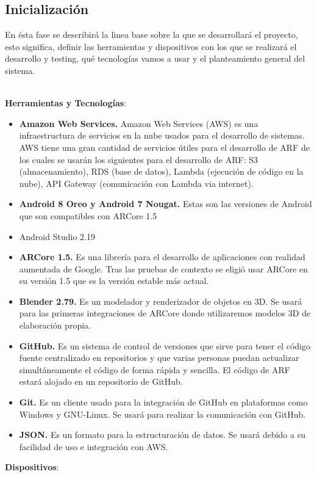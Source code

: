 \subsection{Inicialización}
En ésta fase se describirá la linea base sobre la que se desarrollará el proyecto, esto significa, definir las herramientas y dispositivos con los que se realizará el desarrollo y testing, qué tecnologías vamos a usar y el planteamiento general del sistema.\par
\noindent
\\
\textbf{Herramientas y Tecnologías}:
	\begin{itemize}
			\item \textbf{Amazon Web Services.} Amazon Web Services (AWS) es una infraestructura de servicios en la nube usados para el desarrollo de sistemas. AWS tiene una gran cantidad de servicios útiles para el desarrollo de ARF de los cuales se usarán los siguientes para el desarrollo de ARF: S3 (almacenamiento), RDS (base de datos), Lambda (ejecución de código en la nube), API Gateway (comunicación con Lambda via internet).
			\item \textbf{Android 8 Oreo y Android 7 Nougat.} Estas son las versiones de Android que son compatibles con ARCore 1.5
			\item Android Studio 2.19
			\item \textbf{ARCore 1.5.} Es una librería para el desarrollo de aplicaciones con realidad aumentada de Google. Tras las pruebas de contexto se eligió usar ARCore en su versión 1.5 que es la versión estable más actual.
			\item \textbf{Blender 2.79.} Es un modelador y renderizador de objetos en 3D. Se usará para las primeras integraciones de ARCore donde utilizaremos modelos 3D de elaboración propia.
			\item \textbf{GitHub.} Es un sistema de control de versiones que sirve para tener el código fuente centralizado en repositorios y que varias personas puedan actualizar simultáneamente el código de forma rápida y sencilla. El código de ARF estará alojado en un repositorio de GitHub.
			\item \textbf{Git.} Es un cliente usado para la integración de GitHub en plataformas como Windows y GNU-Linux. Se usará para realizar la comunicación con GitHub.
	  		\item \textbf{JSON.} Es un formato para la estructuración de datos. Se usará debido a su facilidad de uso e integración con AWS.
	\end{itemize}
	\noindent
\textbf{Dispositivos}:
